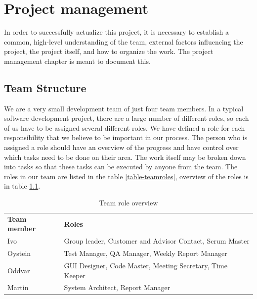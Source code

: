 \chapter{Project management}

\minitoc

In order to successfully actualize this project, it is necessary to establish a common, high-level understanding of the team, external factors influencing the project, the project itself, and how to organize the work. The project management chapter is meant to document this.

\clearpage

\section{Team Structure}
We are a very small development team of just four team members. In a typical software development project, there are a large number of different roles, so each of us have to be assigned several different roles. We have defined a role for each responsibility that we believe to be important in our process. The person who is assigned a role should have an overview of the progress and have control over which tasks need to be done on their area. The work itself may be broken down into tasks so that these tasks can be executed by anyone from the team. The roles in our team are listed in the table \ref{table-teamroles}, overview of the roles is in table \ref{table-rolesoverview}.

\begin{table}
\centering
\begin{tabular}{ l  l }
  \hline
  \textbf{Team member} & \textbf{Roles} \\
  Ivo & Group leader, Customer and Advisor Contact, Scrum Master \\
  Oystein & Test Manager, QA Manager, Weekly Report Manager \\
  Oddvar & GUI Designer, Code Master, Meeting Secretary, Time Keeper \\
  Martin & System Architect, Report Manager \\
  \hline
\end{tabular}
\caption{Team role overview}
\label{table-rolesoverview}
\end{table}


